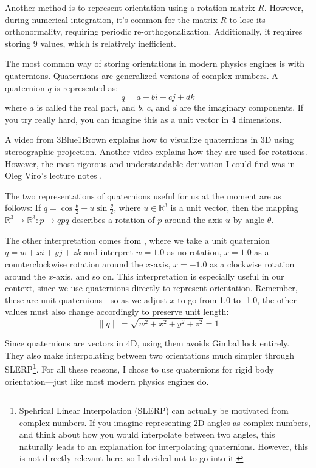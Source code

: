 Another method is to represent orientation using a rotation matrix $R$. However, during numerical integration, it's common for the matrix $R$ to lose its orthonormality, requiring periodic re-orthogonalization. Additionally, it requires storing 9 values, which is relatively inefficient.

The most common way of storing orientations in modern physics engines is with quaternions. Quaternions are generalized versions of complex numbers. A quaternion $q$ is represented as:
\[
q = a + bi + cj + dk
\]
where $a$ is called the real part, and $b$, $c$, and $d$ are the imaginary components. If you try really hard, you can imagine this as a unit vector in 4 dimensions.

A video from 3Blue1Brown \cite{3b1b_video} explains how to visualize quaternions in 3D using stereographic projection. Another video \cite{sutrabla_video} explains how they are used for rotations. However, the most rigorous and understandable derivation I could find was in Oleg Viro's lecture notes \cite{viro2016lecture}.

The two representations of quaternions useful for us at the moment are as follows:  
If $q = \cos{\frac{\theta}{2}} + u\sin{\frac{\theta}{2}}$, where $u \in \mathbb{R}^3$ is a unit vector, then the mapping $\mathbb{R}^3 \rightarrow \mathbb{R}^3 : p \rightarrow qp\bar{q}$ describes a rotation of $p$ around the axis $u$ by angle $\theta$.

The other interpretation comes from \cite{sutrabla_video}, where we take a unit quaternion $q = w + xi + yj + zk$ and interpret $w = 1.0$ as no rotation, $x = 1.0$ as a counterclockwise rotation around the $x$-axis, $x = -1.0$ as a clockwise rotation around the $x$-axis, and so on. This interpretation is especially useful in our context, since we use quaternions directly to represent orientation. Remember, these are unit quaternions—so as we adjust $x$ to go from 1.0 to -1.0, the other values must also change accordingly to preserve unit length:
\[
\|q\| = \sqrt{w^2 + x^2 + y^2 + z^2} = 1
\]

Since quaternions are vectors in 4D, using them avoids Gimbal lock entirely. They also make interpolating between two orientations much simpler through SLERP\footnote{Spehrical Linear Interpolation (SLERP) can actually be motivated from complex numbers. If you imagine representing 2D angles as complex numbers, and think about how you would interpolate between two angles, this naturally leads to an explanation for interpolating quaternions. However, this is not directly relevant here, so I decided not to go into it.}. For all these reasons, I chose to use quaternions for rigid body orientation—just like most modern physics engines do.

